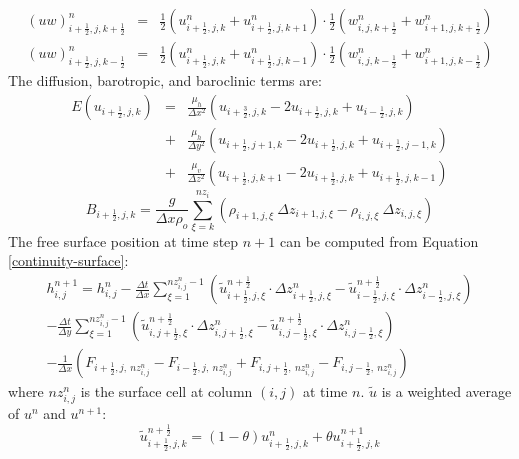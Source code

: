 \begin{eqnarray*}
(uw)^n_{i+ \frac{1}{2} ,j ,k+ \frac{1}{2}}&=&\frac{1}{2}(u^n_{i+
\frac{1}{2} ,j,k}+u^n_{i+ \frac{1}{2} ,j,k+1}) \cdot
\frac{1}{2}(w^n_{i,j ,k+ \frac{1}{2}}+w^n_{i+1,j ,k+
\frac{1}{2}})\\ (uw)^n_{i+ \frac{1}{2} ,j ,k-
\frac{1}{2}}&=&\frac{1}{2}(u^n_{i+ \frac{1}{2} ,j,k}+u^n_{i+
\frac{1}{2} ,j,k-1}) \cdot \frac{1}{2}(w^n_{i,j ,k-
\frac{1}{2}}+w^n_{i+1,j ,k- \frac{1}{2}})
\end{eqnarray*}
 The diffusion, barotropic, and baroclinic terms are:
\begin{eqnarray}
E(u_{i+ \frac{1}{2} ,j,k}) &=& \frac{\mu_h}{\Delta x^2} (u_{i +
\frac{3}{2},
j,k}-2u_{i+ \frac{1}{2} ,j,k} + u_{i- \frac{1}{2} , j,k})\nonumber \\
&+& \frac{\mu_h}{\Delta y^2} (u_{i + \frac{1}{2},
j+1,k}-2u_{i+ \frac{1}{2} ,j,k} + u_{i+ \frac{1}{2} ,j-1,k})\nonumber \\
&+& \frac{\mu_v}{\Delta z^2} (u_{i+ \frac{1}{2} ,j,k+1}-2u_{i+
\frac{1}{2} ,j,k}+u_{i+ \frac{1}{2} ,j,k-1})
\end{eqnarray}
\begin{equation}
B_{i+ \frac{1}{2} ,j,k}= \frac{g}{\Delta x \rho_o}
\sum_{\xi=k}^{nz_i}(\rho_{i+1,j,\xi} \ \Delta
z_{i+1,j,\xi}-\rho_{i,j,\xi} \ \Delta z_{i,j,\xi})
\end{equation}
 The free surface position at time step $n+1$ can be computed
from Equation \ref{continuity-surface}:
\begin{eqnarray}
h_{i,j}^{n+1}=h_{i,j}^n - \frac{\Delta t}{\Delta x}
\sum_{\xi=1}^{nz_{i,j}^n-1} ( \widetilde{u}_{i+ \frac{1}{2},j ,\xi}^{n +
\frac{1}{2}}  \cdot \Delta z_{i+ \frac{1}{2},j,\xi}^n -
\widetilde{u}_{i- \frac{1}{2},j,\xi}^{n + \frac{1}{2}}  \cdot
\Delta z_{i- \frac{1}{2},j , \xi}^n) \nonumber \\
- \frac{\Delta t}{\Delta y}
\sum_{\xi=1}^{nz_{i,j}^n-1} ( \widetilde{u}_{i,j+ \frac{1}{2},\xi}^{n +
\frac{1}{2}}  \cdot \Delta z_{i,j+ \frac{1}{2},\xi}^n -
\widetilde{u}_{i,j- \frac{1}{2},\xi}^{n + \frac{1}{2}}  \cdot
\Delta z_{i,j- \frac{1}{2}, \xi}^n)\nonumber \\
-\frac{1}{\Delta x}(  F_{i+ \frac{1}{2},j ,\ nz^n_{i,j}}- F_{i-
\frac{1}{2},j ,\ nz^n_{i,j}}+F_{i,j+ \frac{1}{2},\ nz^n_{i,j}}- F_{i,j-
\frac{1}{2},\ nz^n_{i,j}} )
\end{eqnarray}
where $nz^n_{i,j}$ is the surface cell at column $(i,j)$ at time $n$.
$\widetilde{u}$ is a weighted average of $u^n$ and $u^{n+1}$:
\begin{equation}
\widetilde{u}_{i+ \frac{1}{2},j,k}^{n + \frac{1}{2}}
=(1-\theta)u_{i+ \frac{1}{2},j,k}^{n}+\theta u_{i+ \frac{1}{2}
,j,k}^{n+1}
\end{equation}

